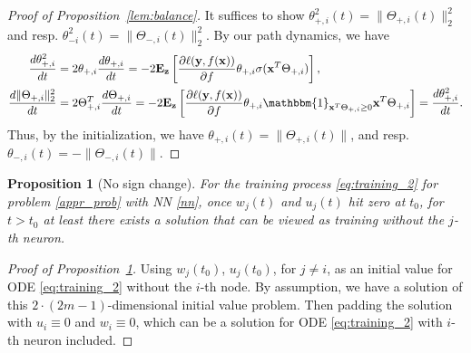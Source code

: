 \documentclass[11pt]{article}
\numberwithin{equation}{section}
\newtheorem{proposition}{Proposition}[section]
\def\bd#1{\mathbf{#1}}
\def\bx{\bd{x}}
\def\by{\bd{y}}
\begin{document}
\begin{proof}[Proof of Proposition~\ref{lem:balance}]
	It suffices to show $\theta^2_{+,i}(t) = \|\Theta_{+,i}(t)\|_2^2$ and resp. $\theta^2_{-i}(t)=\|\Theta_{-,i}(t)\|_2^2$. By our path dynamics, we have
	\begin{align}
		\frac{d\theta^2_{+,i}}{dt} &= 2\theta_{+,i}\frac{d\theta_{+,i}}{dt} = -2\mathbf{E}_{\bd{z}}\left[\frac{\partial \ell(\by,f(\bx))}{\partial f}\theta_{+,i}\sigma(\bx^T\Theta_{+,i})\right],\\
		\frac{d\|\Theta_{+,i}\|_2^2}{dt}&=2\Theta_{+,i}^T\frac{d\Theta_{+,i}}{dt} = -2\mathbf{E}_{\bd{z}} \left[\frac{\partial \ell(\by,f(\bx))}{\partial f}\theta_{+,i}\mathbbm{1}_{\bx^T\Theta_{+,i}\geq0}\bx^T\Theta_{+,i}\right] = \frac{d\theta_{+,i}^2}{dt}.
	\end{align}
	Thus, by the initialization, we have $\theta_{+,i}(t) = \|\Theta_{+,i}(t)\|$,  and resp. $\theta_{-,i}(t) = -\|\Theta_{-,i}(t)\|$.
\end{proof}



\begin{proposition}[No sign change]
		    \label{lem:no-change-sign}
		    For the training process \eqref{eq:training_2} for problem \eqref{appr_prob} with NN \eqref{nn}, once $w_j(t)$ and $u_j(t)$ hit zero at $t_0$, for $t>t_0$ at least there exists a solution that can be viewed as training without the $j$-th neuron.
\end{proposition}



\begin{proof}[Proof of Proposition~\ref{lem:no-change-sign}]
  Using $w_j(t_0)$, $u_j(t_0)$, for $j\neq i$, as an initial value for ODE \eqref{eq:training_2} without the $i$-th node. By assumption, we have a solution of this $2\cdot(2m-1)$-dimensional initial value problem. Then padding the solution with $u_i \equiv 0$ and $w_i\equiv 0$, which can be a solution for ODE  \eqref{eq:training_2} with $i$-th neuron included.
\end{proof}
\end{document}
